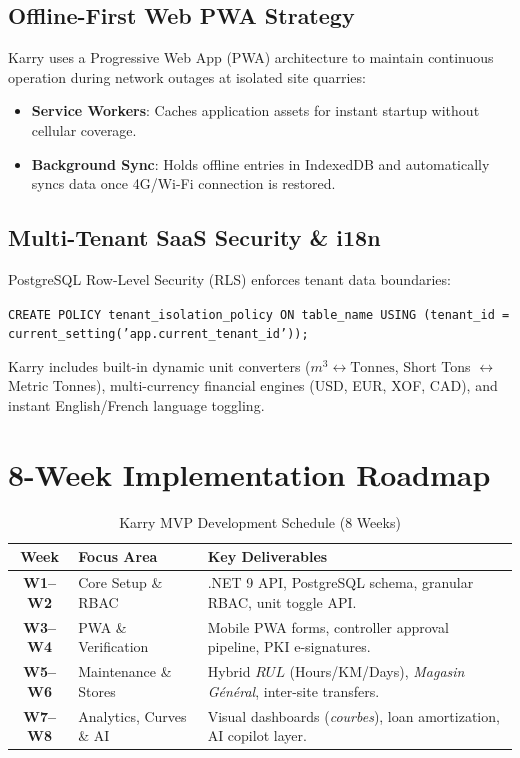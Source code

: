 \documentclass[11pt, a4paper]{article}
\begin{document}
\subsection{Offline-First Web PWA Strategy}
Karry uses a Progressive Web App (PWA) architecture to maintain continuous operation during network outages at isolated site quarries:
\begin{itemize}
    \item \textbf{Service Workers}: Caches application assets for instant startup without cellular coverage.
    \item \textbf{Background Sync}: Holds offline entries in IndexedDB and automatically syncs data once 4G/Wi-Fi connection is restored.
\end{itemize}

\subsection{Multi-Tenant SaaS Security \& i18n}
PostgreSQL Row-Level Security (RLS) enforces tenant data boundaries:
\begin{center}
\small\texttt{CREATE POLICY tenant\_isolation\_policy ON table\_name USING (tenant\_id = current\_setting('app.current\_tenant\_id'));}
\end{center}
Karry includes built-in dynamic unit converters ($m^3 \leftrightarrow \text{Tonnes}$, Short Tons $\leftrightarrow$ Metric Tonnes), multi-currency financial engines (USD, EUR, XOF, CAD), and instant English/French language toggling.

\section{8-Week Implementation Roadmap}

\begin{table}[htbp]
\centering
\caption{Karry MVP Development Schedule (8 Weeks)}
\vspace{0.2cm}
\begin{tabular}{cll}
\toprule
\textbf{Week} & \textbf{Focus Area} & \textbf{Key Deliverables} \\
\midrule
\textbf{W1--W2} & Core Setup \& RBAC & .NET 9 API, PostgreSQL schema, granular RBAC, unit toggle API. \\
\textbf{W3--W4} & PWA \& Verification & Mobile PWA forms, controller approval pipeline, PKI e-signatures. \\
\textbf{W5--W6} & Maintenance \& Stores & Hybrid $RUL$ (Hours/KM/Days), \textit{Magasin G\'en\'eral}, inter-site transfers. \\
\textbf{W7--W8} & Analytics, Curves \& AI & Visual dashboards (\textit{courbes}), loan amortization, AI copilot layer. \\
\bottomrule
\end{tabular}
\end{table}
\end{document}

